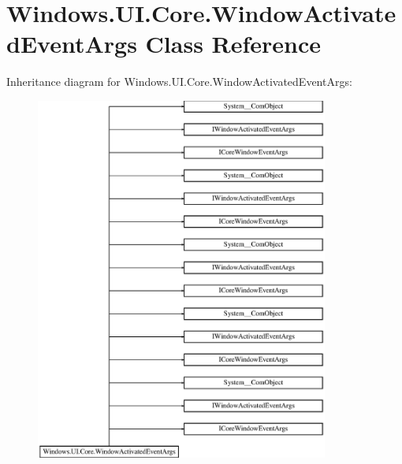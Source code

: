 \hypertarget{class_windows_1_1_u_i_1_1_core_1_1_window_activated_event_args}{}\section{Windows.\+U\+I.\+Core.\+Window\+Activated\+Event\+Args Class Reference}
\label{class_windows_1_1_u_i_1_1_core_1_1_window_activated_event_args}
Inheritance diagram for Windows.\+U\+I.\+Core.\+Window\+Activated\+Event\+Args\+:\begin{figure}[H]
\begin{center}
\leavevmode
\includegraphics[height=12.000000cm]{class_windows_1_1_u_i_1_1_core_1_1_window_activated_event_args}
\end{center}
\end{figure}
